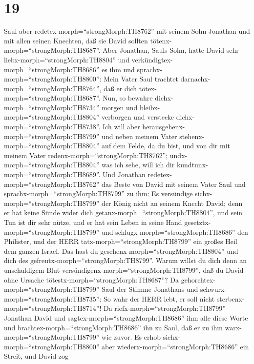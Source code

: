 \hypertarget{section-18}{%
\section{19}\label{section-18}}

 Saul aber redetex-morph=``strongMorph:TH8762'' mit seinem
Sohn Jonathan und mit allen seinen Knechten, daß sie David sollten
tötenx-morph=``strongMorph:TH8687''. Aber Jonathan, Sauls Sohn, hatte
David sehr liebx-morph=``strongMorph:TH8804''  und
verkündigtex-morph=``strongMorph:TH8686'' es ihm und
sprachx-morph=``strongMorph:TH8800'': Mein Vater Saul trachtet
darnachx-morph=``strongMorph:TH8764'', daß er dich
tötex-morph=``strongMorph:TH8687''. Nun, so bewahre
dichx-morph=``strongMorph:TH8734'' morgen und
bleibx-morph=``strongMorph:TH8804'' verborgen und verstecke
dichx-morph=``strongMorph:TH8738''.  Ich will aber
herausgehenx-morph=``strongMorph:TH8799'' und neben meinem Vater
stehenx-morph=``strongMorph:TH8804'' auf dem Felde, da du bist, und von
dir mit meinem Vater redenx-morph=``strongMorph:TH8762'';
undx-morph=``strongMorph:TH8804'' was ich sehe, will ich dir
kundtunx-morph=``strongMorph:TH8689''.  Und Jonathan
redetex-morph=``strongMorph:TH8762'' das Beste von David mit seinem
Vater Saul und sprachx-morph=``strongMorph:TH8799'' zu ihm: Es
versündige sichx-morph=``strongMorph:TH8799'' der König nicht an seinem
Knecht David; denn er hat keine Sünde wider dich
getanx-morph=``strongMorph:TH8804'', und sein Tun ist dir sehr nütze,
 und er hat sein Leben in seine Hand
gesetztx-morph=``strongMorph:TH8799'' und
schlugx-morph=``strongMorph:TH8686'' den Philister, und der HERR
tatx-morph=``strongMorph:TH8799'' ein großes Heil dem ganzen Israel. Das
hast du gesehenx-morph=``strongMorph:TH8804'' und dich des
gefreutx-morph=``strongMorph:TH8799''. Warum willst du dich denn an
unschuldigem Blut versündigenx-morph=``strongMorph:TH8799'', daß du
David ohne Ursache tötestx-morph=``strongMorph:TH8687''?  Da
gehorchtex-morph=``strongMorph:TH8799'' Saul der Stimme Jonathans und
schwurx-morph=``strongMorph:TH8735'': So wahr der HERR lebt, er soll
nicht sterbenx-morph=``strongMorph:TH8714''!  Da
riefx-morph=``strongMorph:TH8799'' Jonathan David und
sagtex-morph=``strongMorph:TH8686'' ihm alle diese Worte und
brachtex-morph=``strongMorph:TH8686'' ihn zu Saul, daß er zu ihm
warx-morph=``strongMorph:TH8799'' wie zuvor.  Es erhob
sichx-morph=``strongMorph:TH8800'' aber
wiederx-morph=``strongMorph:TH8686'' ein Streit, und David zog
